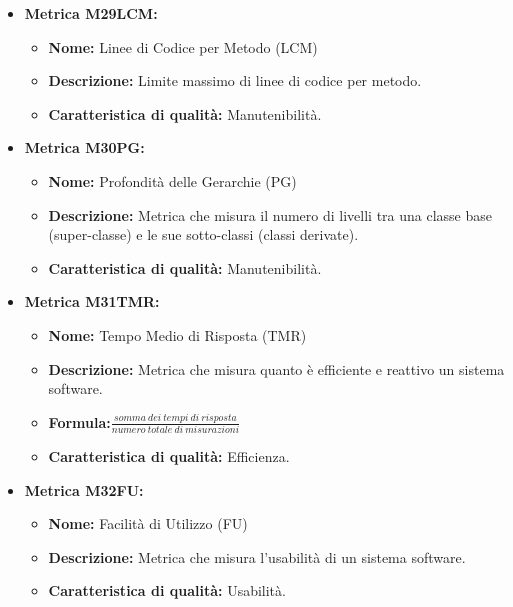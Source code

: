 \begin{itemize}
          \item \textbf{Metrica M29LCM:}
          \begin{itemize}
              \item \textbf{Nome:} Linee di Codice per Metodo (LCM)
              \item \textbf{Descrizione:} Limite massimo di linee di codice per metodo.
              \item \textbf{Caratteristica di qualità:} Manutenibilità.
          \end{itemize} 

          \item \textbf{Metrica M30PG:}
          \begin{itemize}
              \item \textbf{Nome:} Profondità delle Gerarchie (PG)
              \item \textbf{Descrizione:} Metrica che misura il numero di livelli tra una classe base (super-classe) e le sue sotto-classi (classi derivate).
              \item \textbf{Caratteristica di qualità:} Manutenibilità.
          \end{itemize} 

            \item \textbf{Metrica M31TMR:}
                  \begin{itemize}
                      \item \textbf{Nome:} Tempo Medio di Risposta (TMR)
                      \item \textbf{Descrizione:} Metrica che misura quanto è efficiente e reattivo un sistema software.
                      \item \textbf{Formula:}$\frac{somma \ dei \ tempi \ di \ risposta}{numero \ totale \ di \ misurazioni}$
                      \item \textbf{Caratteristica di qualità:} Efficienza.
                    \end{itemize}  


            \item \textbf{Metrica M32FU:}
                  \begin{itemize}
                      \item \textbf{Nome:} Facilità di Utilizzo (FU)
                      \item \textbf{Descrizione:} Metrica che misura l'usabilità di un sistema software.
                      \item \textbf{Caratteristica di qualità:} Usabilità.
                    \end{itemize}


\end{itemize}

